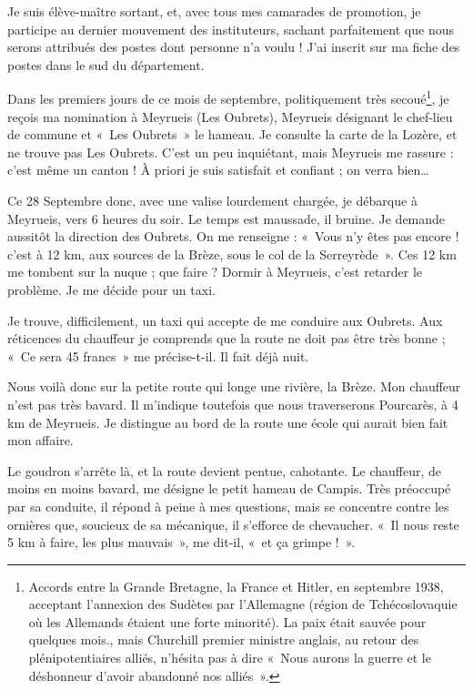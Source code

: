 

Je suis élève-maître sortant, et, avec tous mes camarades de promotion, je participe au dernier mouvement des instituteurs, sachant parfaitement que nous serons attribués des postes dont personne n'a voulu ! J'ai inscrit sur ma fiche des postes dans le sud du département.

Dans les premiers jours de ce mois de septembre, politiquement très secoué\footnote{Accords entre la Grande Bretagne, la France et Hitler, en septembre 1938, acceptant l'annexion des Sudètes par l'Allemagne (région de Tchécoslovaquie où les Allemands étaient une forte minorité). La paix était sauvée pour quelques mois., mais Churchill premier ministre anglais, au retour des plénipotentiaires alliés, n'hésita pas à dire «~Nous aurons la guerre et le déshonneur d'avoir abandonné nos alliés~».}, je reçois ma nomination à Meyrueis (Les Oubrets), Meyrueis désignant le chef-lieu de commune et «~Les Oubrets~» le hameau. Je consulte la carte de la Lozère, et ne trouve pas Les Oubrets. C'est un peu inquiétant, mais Meyrueis me rassure : c'est même un canton ! À priori je suis satisfait et confiant ; on verra bien…

Ce 28 Septembre donc, avec une valise lourdement chargée, je débarque à Meyrueis, vers 6 heures du soir. Le temps est maussade, il bruine. Je demande aussitôt la direction des Oubrets. On me renseigne : «~Vous n'y êtes pas encore ! c'est à 12 km, aux sources de la Brèze, sous le col de la Serreyrède~». Ces 12 km me tombent sur la nuque ; que faire ? Dormir à Meyrueis, c'est retarder le problème. Je me décide pour un taxi.

Je trouve, difficilement, un taxi qui accepte de me conduire aux Oubrets. Aux réticences du chauffeur je comprends que la route ne doit pas être très bonne ; «~Ce sera 45 francs~» me précise-t-il. Il fait déjà nuit.

Nous voilà donc sur la petite route qui longe une rivière, la Brèze. Mon chauffeur n'est pas très bavard. Il m'indique toutefois que nous traverserons Pourcarès, à 4 km de Meyrueis. Je distingue au bord de la route une école qui aurait bien fait mon affaire.

Le goudron s'arrête là, et la route devient pentue, cahotante. Le chauffeur, de moins en moins bavard, me désigne le petit hameau de Campis. Très préoccupé par sa conduite, il répond à peine à mes questions, mais se concentre contre les ornières que, soucieux de sa mécanique, il s'efforce de chevaucher. «~Il nous reste 5 km à faire, les plus mauvais~», me dit-il, «~et ça grimpe !~».

